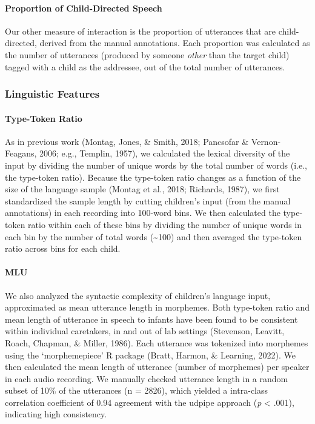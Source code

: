 \documentclass[
  man]{apa6}
\let\oldparagraph\paragraph
\renewcommand{\paragraph}[1]{\oldparagraph{#1}\mbox{}}
\begin{document}
\hypertarget{proportion-of-child-directed-speech}{%
\paragraph{Proportion of Child-Directed Speech}\label{proportion-of-child-directed-speech}}

Our other measure of interaction is the proportion of utterances that are child-directed, derived from the manual annotations. Each proportion was calculated as the number of utterances (produced by someone \emph{other} than the target child) tagged with a child as the addressee, out of the total number of utterances.

\hypertarget{linguistic-features}{%
\subsubsection{Linguistic Features}\label{linguistic-features}}

\hypertarget{type-token-ratio}{%
\paragraph{Type-Token Ratio}\label{type-token-ratio}}

As in previous work (Montag, Jones, \& Smith, 2018; Pancsofar \& Vernon-Feagans, 2006; e.g., Templin, 1957), we calculated the lexical diversity of the input by dividing the number of unique words by the total number of words (i.e., the type-token ratio). Because the type-token ratio changes as a function of the size of the language sample (Montag et al., 2018; Richards, 1987), we first standardized the sample length by cutting children's input (from the manual annotations) in each recording into 100-word bins. We then calculated the type-token ratio within each of these bins by dividing the number of unique words in each bin by the number of total words (\textasciitilde100) and then averaged the type-token ratio across bins for each child.

\hypertarget{mlu}{%
\paragraph{MLU}\label{mlu}}

We also analyzed the syntactic complexity of children's language input, approximated as mean utterance length in morphemes. Both type-token ratio and mean length of utterance in speech to infants have been found to be consistent within individual caretakers, in and out of lab settings (Stevenson, Leavitt, Roach, Chapman, \& Miller, 1986). Each utterance was tokenized into morphemes using the `morphemepiece' R package (Bratt, Harmon, \& Learning, 2022). We then calculated the mean length of utterance (number of morphemes) per speaker in each audio recording. We manually checked utterance length in a random subset of 10\% of the utterances (n = 2826), which yielded a intra-class correlation coefficient of 0.94 agreement with the udpipe approach (\emph{p} \textless{} .001), indicating high consistency.
\end{document}
